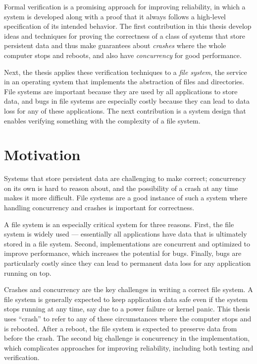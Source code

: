 Formal verification is a promising approach for improving reliability, in which
a system is developed along with a proof that it always follows a high-level
specification of its intended behavior. The first contribution in this
thesis develop ideas and techniques for proving the correctness of a class of
systems that store persistent data and thus make guarantees about \emph{crashes}
where the whole computer stops and reboots, and also have \emph{concurrency} for
good performance.

Next, the thesis applies these verification techniques to a \emph{file system},
the service in an operating system that implements the abstraction of files and
directories. File systems are important because they are used by all
applications to store data, and bugs in file systems are especially costly
because they can lead to data loss for any of these applications. The next
contribution is a system design that enables verifying something with the
complexity of a file system.

\section{Motivation}
\label{sec:intro:motivation}

Systems that store persistent data are challenging to make correct; concurrency
on its own is hard to reason about, and the possibility of a crash at any time
makes it more difficult. File systems are a good instance of such a system where
handling concurrency and crashes is important for correctness.

A file system is an especially critical system for
three reasons. First, the file system is widely used --- essentially all applications have
data that is ultimately stored in a file system. Second, implementations are
concurrent and optimized to improve performance, which increases the potential
for bugs. Finally, bugs are particularly costly since they can lead to permanent
data loss for any application running on top.

Crashes and
concurrency are the key challenges in writing a correct file system.
A file system is generally expected to keep application data safe
even if the system stops running at any time, say due to a power failure or
kernel panic. This thesis uses ``crash'' to refer to any of these circumstances
where the computer stops and is rebooted. After a reboot, the file system is
expected to preserve data from before the crash. The second big challenge is
concurrency in the implementation, which complicates approaches for improving
reliability, including both testing and verification.

